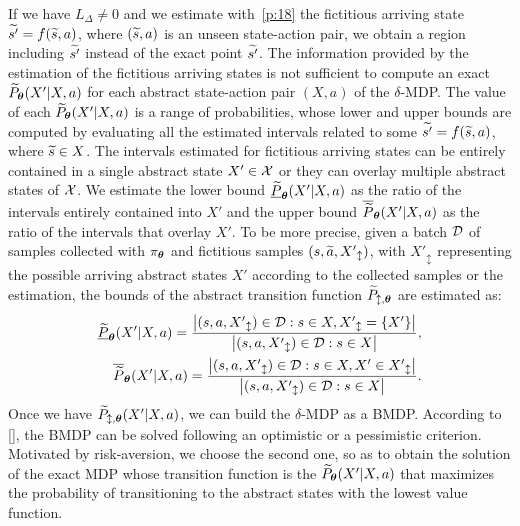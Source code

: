 If we have $L_{\Delta} \neq 0$ and we estimate with~\eqref{p:18} the fictitious arriving state $\widetilde{s'} = f(\widetilde{s}, a)$, where $(\widetilde{s},a)$ is an unseen state-action pair, we obtain a region including $\widetilde{s'}$ instead of the exact point $\widetilde{s'}$. The information provided by the estimation of the fictitious arriving states is not sufficient to compute an exact $\widetilde{P}_{\boldsymbol{\theta}}(X'|X,a)$ for each abstract state-action pair $(X,a)$ of the $\delta$-\ac{MDP}. The value of each $\widetilde{P}_{\boldsymbol{\theta}}(X'|X,a)$ is a range of probabilities, whose lower and upper bounds are computed by evaluating all the estimated intervals related to some $\widetilde{s'}=f(\widetilde{s}, a)$, where $\widetilde{s} \in X$. The intervals estimated for fictitious arriving states can be entirely contained in a single abstract state $X' \in \mathcal{X}$ or they can overlay multiple abstract states of $\mathcal{X}$. We estimate the lower bound $\underline{\widetilde{P}}_{\boldsymbol{\theta}}(X'|X,a)$ as the ratio of the intervals entirely contained into $X'$ and the upper bound $\overline{\widetilde{P}}_{\boldsymbol{\theta}}(X'|X,a)$ as the ratio of the intervals that overlay $X'$. To be more precise, given a batch $\mathcal{D}$ of samples collected with $\pi_{\boldsymbol{\theta}}$ and fictitious samples $(s,\widetilde{a},{X'}_{\updownarrow})$, with ${X'}_{\updownarrow}$ representing the possible arriving abstract states $X'$ according to the collected samples or the estimation, the bounds of the abstract transition function $\widetilde{P}_{\updownarrow, \boldsymbol{\theta}}$ are estimated as:
\begin{align}
\underline{\widetilde{P}}_{\boldsymbol{\theta}}(X'|X,a) = \frac{\big|(s,a,{X'}_{\updownarrow}) \in \mathcal{D}: s \in X, {X'}_{\updownarrow}=\{X'\}\big|}{\big|(s,a,{X'}_{\updownarrow}) \in \mathcal{D}: s \in X\big|},\\
\overline{\widetilde{P}}_{\boldsymbol{\theta}}(X'|X,a) = \frac{\big|(s,a,{X'}_{\updownarrow}) \in \mathcal{D}: s \in X, X' \in {X'}_{\updownarrow}\big|}{\big|(s,a,{X'}_{\updownarrow}) \in \mathcal{D}: s \in X\big|}.
\end{align}Once we have $\widetilde{P}_{\updownarrow, \boldsymbol{\theta}}(X'|X,a)$, we can build the $\delta$-\ac{MDP} as a \ac{BMDP}. According to [\cite{givan2000bounded}], the \ac{BMDP} can be solved following an optimistic or a pessimistic criterion. Motivated by risk-aversion, we choose the second one, so as to obtain the solution of the exact \ac{MDP} whose transition function is the $\widetilde{P}_{\boldsymbol{\theta}}(X'|X,a)$ that maximizes the probability of transitioning to the abstract states with the lowest value function.


